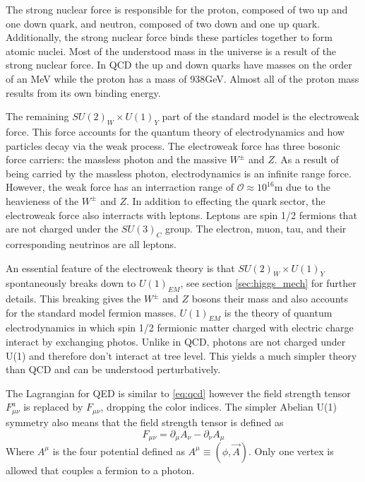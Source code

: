 The strong nuclear force is responsible for the proton, composed of two up and one down quark, and neutron, composed of two down and one up quark.
Additionally, the strong nuclear force binds these particles together to form atomic nuclei.
Most of the understood mass in the universe is a result of the strong nuclear force.
In QCD the up and down quarks have masses on the order of an MeV while the proton has a mass of 938GeV.
Almost all of the proton mass results from its own binding energy.

The remaining $SU(2)_W\times U(1)_Y$ part of the standard model is the electroweak force.
This force accounts for the quantum theory of electrodynamics and how particles decay via the weak process.
The electroweak force has three bosonic force carriers: the massless photon and the massive $W^\pm$ and $Z$.
As a result of being carried by the massless photon, electrodynamics is an infinite range force.
However, the weak force has an interraction range of $\mathcal{O}\approx10^{16}$m due to the heavieness of the $W^{\pm}$ and $Z$.
In addition to effecting the quark sector, the electroweak force also interracts with leptons.
Leptons are spin 1/2 fermions that are not charged under the $SU(3)_C$ group. 
The electron, muon, tau, and their corresponding neutrinos are all leptons.

An essential feature of the electroweak theory is that $SU(2)_W\times U(1)_Y$ spontaneously breaks down to $U(1)_{EM}$, see section \ref{sec:higgs_mech} for further details.
This breaking gives the $W^\pm$ and $Z$ bosons their mass and also accounts for the standard model fermion masses.
$U(1)_{EM}$ is the theory of quantum electrodynamics in which spin 1/2 fermionic matter charged with electric charge interact by exchanging photos.
Unlike in QCD, photons are not charged under U(1) and therefore don't interact at tree level.
This yields a much simpler theory than QCD and can be understood perturbatively.

The Lagrangian for QED is similar to \ref{eq:qcd} however the field strength tensor $F^a_{\mu\nu}$ is replaced by $F_{\mu\nu}$, dropping the color indices.
The simpler Abelian U(1) symmetry also means that the field strength tensor is defined as
\begin{equation}
  F_{\mu\nu}=\partial_\mu A_\nu - \partial_\nu A_\mu
\end{equation}
Where $A^\mu$ is the four potential defined as $A^\mu \equiv (\phi, \vec{A})$.
Only one vertex is allowed that couples a fermion to a photon.

